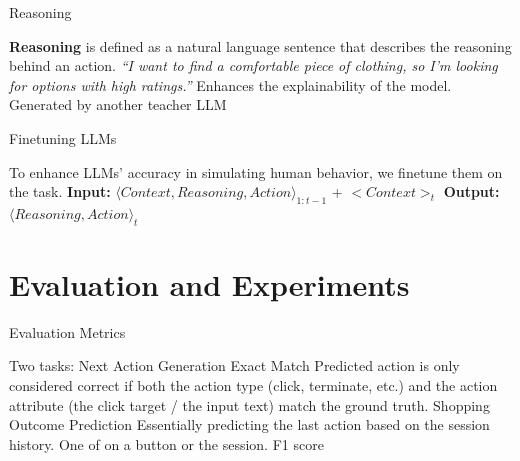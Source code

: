 \documentclass[scheme=plain]{beamer}
\begin{document}
\begin{frame}{Reasoning}
  \begin{outline}
    \1 \textbf{Reasoning} is defined as a natural language sentence that describes the reasoning behind an action.
      \2 \textit{``I want to find a comfortable piece of clothing, so I’m looking for options with high ratings.''}
    \1 Enhances the explainability of the model.
    \1 Generated by another teacher LLM
  \end{outline}
\end{frame}

\begin{frame}{Finetuning LLMs}
  \begin{outline}
    \1 To enhance LLMs' accuracy in simulating human behavior, we finetune them on the task.
    \2 \textbf{Input:} ${\langle Context, Reasoning, Action\rangle}_{1:t-1}$ + $<Context>_t$ 
    \2 \textbf{Output:} $\langle Reasoning, Action\rangle _{t}$
  \end{outline}
\end{frame}

\section{Evaluation and Experiments}

\begin{frame}{Evaluation Metrics}
  \begin{outline}
    \1 Two tasks: 
    \1 Next Action Generation
      \2 Exact Match
      \2 Predicted action is only considered correct if both the action type (click, terminate, etc.) and the action attribute (the click target / the input text) match the ground truth.
      \pause
    \1 Shopping Outcome Prediction
      \2 Essentially predicting the last action based on the session history.
      \2 One of  on a  button or  the session.
      \2 F1 score
  \end{outline}
\end{frame}
\end{document}
